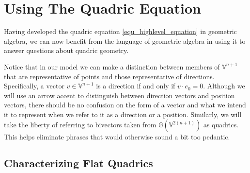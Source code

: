 \documentclass{ecgd-l}
\theoremstyle{definition}
\theoremstyle{remark}
\numberwithin{equation}{section}
\newcommand{\G}{\mathbb{G}}
\newcommand{\V}{\mathbb{V}}
\begin{document}
\section{Using The Quadric Equation}

Having developed the quadric equation \eqref{equ_highlevel_equation} in geometric algebra, we can
now benefit from the language of geometric algebra in using it to answer questions about quadric geometry.

Notice that in our model we can make a distinction between members of $\V^{n+1}$ that are
representative of points and those representative of directions.  Specifically, a vector $v\in\V^{n+1}$
is a direction if and only if $v\cdot e_0=0$.  Although we will use an arrow accent to distinguish
between direction vectors and position vectors, there should be no confusion on the form
of a vector and what we intend it to represent when we refer to it as a direction or a position.
Similarly, we will take the liberty of referring to bivectors taken
from $\G(\V^{2(n+1)})$ as quadrics.  This helps eliminate phrases that would otherwise sound a bit
too pedantic.

\subsection{Characterizing Flat Quadrics}
\end{document}
